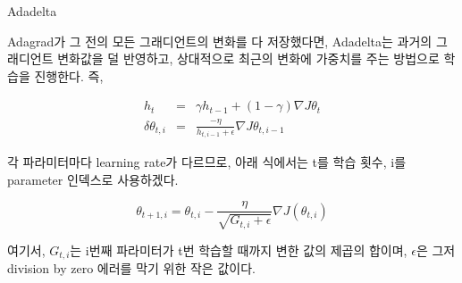 \documentclass{beamer}
\begin{document}
\begin{frame}{Adadelta}

Adagrad가 그 전의 모든 그래디언트의 변화를 다 저장했다면, Adadelta는 과거의 그래디언트 변화값을 덜 반영하고, 상대적으로 최근의 변화에 가중치를 주는 방법으로 학습을 진행한다. 즉, 

\begin{eqnarray} 
h_t &=& \gamma h_{t-1} + (1-\gamma) \nabla J{\theta_{t}} \\
\delta \theta_{t,i} &=& \frac{-\eta}{h_{t,i-1} + \epsilon} \nabla J{\theta_{t,i-1}}
\end{eqnarray}

각 파라미터마다 learning rate가 다르므로, 아래 식에서는 t를 학습 횟수, i를 parameter 인덱스로 사용하겠다. 

\begin{equation} 
\theta_{t+1,i} = \theta_{t,i} - \frac{\eta}{\sqrt{G_{t, i} + \epsilon}} \nabla J(\theta_{t,i})
\end{equation} 

여기서, $G_{t, i}$는 i번째 파라미터가 t번 학습할 때까지 변한 값의 제곱의 합이며, $\epsilon$은 그저 division by zero 에러를 막기 위한 작은 값이다. 
\end{frame}
\end{document}
